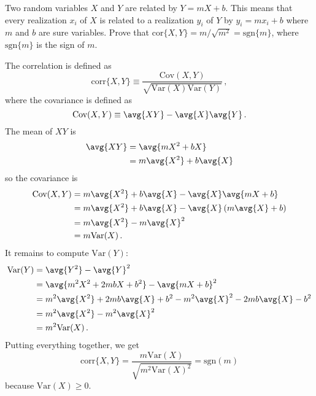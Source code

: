 

Two random variables $X$ and $Y$ are related by $Y=mX+b$.
This means that every realization $x_i$ of $X$ is related to a realization $y_i$ of $Y$ by $y_i = m x_i + b$ where $m$ and $b$ are sure variables.
Prove that $\text{cor}\{X, Y\} = m / \sqrt{m^2} = \text{sgn}\{m\}$, where $\text{sgn}\{m\}$ is the sign of $m$.


The correlation is defined as
\begin{displaymath}
  \text{corr}\{X, Y\} \equiv \frac{\text{Cov}(X,Y)}{\sqrt{\text{Var}(X) \text{Var}(Y)}} \, ,
\end{displaymath}
where the covariance is defined as
\begin{displaymath}
  \text{Cov}(X,Y) \equiv \avg{XY} - \avg{X}\avg{Y} \, .
\end{displaymath}
The mean of $XY$ is
\begin{align*}
  \avg{XY}
  &= \avg{ mX^2 + bX} \\
  &= m \avg{X^2} + b \avg{X}
\end{align*}
so the covariance is
\begin{align*}
  \text{Cov}(X,Y)
  &= m \avg{X^2} + b\avg{X} - \avg{X} \avg{mX+b} \\
  &= m \avg{X^2} + b\avg{X} - \avg{X} \left( m \avg{X} + b \right) \\
  &= m \avg{X^2} - m \avg{X}^2 \\
  &= m \text{Var}(X) \, .
\end{align*}
It remains to compute $\text{Var}(Y)$:
\begin{align*}
  \text{Var}(Y)
  &= \avg{Y^2} - \avg{Y}^2 \\
  &= \avg{m^2 X^2 + 2 m b X + b^2} - \avg{mX + b}^2 \\
  &= m^2 \avg{X^2} + 2mb \avg{X} + b^2 - m^2 \avg{X}^2 - 2mb\avg{X} - b^2 \\
  &= m^2 \avg{X^2} - m^2 \avg{X}^2 \\
  &= m^2 \text{Var}(X) \, .
\end{align*}
Putting everything together, we get
\begin{equation*}
  \text{corr}\{X, Y\} = \frac{m \text{Var}(X)}{\sqrt{m^2 \text{Var}(X)^2}}
  = \text{sgn}(m)
\end{equation*}
because $\text{Var}(X) \ge 0$.
